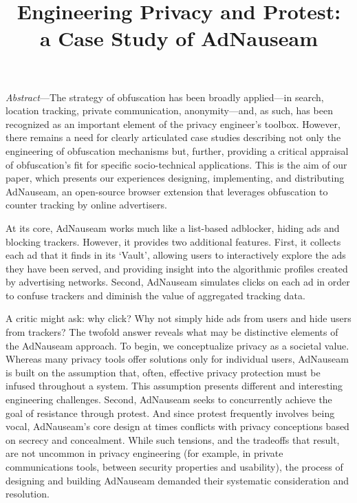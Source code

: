 \documentclass[conference]{IEEEtran}
\begin{document}
\title{Engineering Privacy and Protest:\\a Case Study of AdNauseam}

\author{
   \and
}

\maketitle


\emph{Abstract}---The strategy of obfuscation has been broadly applied---in search, location tracking, private communication, anonymity---and, as such, has been recognized as an important element of the privacy engineer's toolbox. However, there remains a need for clearly articulated case studies describing not only the engineering of obfuscation mechanisms but, further, providing a critical appraisal of obfuscation's fit for specific socio-technical applications. This is the aim of our paper, which presents our experiences designing, implementing, and distributing AdNauseam, an open-source browser extension that leverages obfuscation to counter tracking by online advertisers.

At its core, AdNauseam works much like a list-based adblocker, hiding ads and blocking trackers. However, it provides two additional features. First, it collects each ad that it finds in its ‘Vault’, allowing users to interactively explore the ads they have been served, and providing insight into the algorithmic profiles created by advertising networks. Second, AdNauseam simulates clicks on each ad in order to confuse trackers and diminish the value of aggregated tracking data.

A critic might ask: why click? Why not simply hide ads from users and hide users from trackers? The twofold answer reveals what may be distinctive elements of the AdNauseam approach. To begin, we conceptualize privacy as a societal value. Whereas many privacy tools offer solutions only for individual users, AdNauseam is built on the assumption that, often, effective privacy protection must be infused throughout a system. This assumption presents different and interesting engineering challenges. Second, AdNauseam seeks to concurrently achieve the goal of resistance through protest. And since protest frequently involves being vocal, AdNauseam's core design at times conflicts with privacy conceptions based on secrecy and concealment. While such tensions, and the tradeoffs that result, are not uncommon in privacy engineering (for example, in private communications tools, between security properties and usability), the process of designing and building AdNauseam demanded their systematic consideration and resolution.
\end{document}
